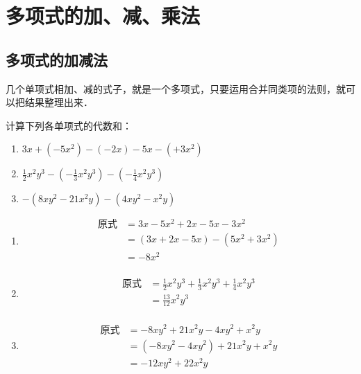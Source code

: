 \section{多项式的加、减、乘法}
\subsection{多项式的加减法}
几个单项式相加、减的式子，就是一个多项式，只要运用合并同类项的法则，就可以把结果整理出来．

\begin{example}
    计算下列各单项式的代数和：
\begin{enumerate}
    \item $3x+(-5x^2)-(-2x)-5x-(+3x^2)$
    \item $\frac{1}{2}x^2y^3-\left(-\frac{1}{3}x^2y^3\right)-\left(-\frac{1}{4}x^2y^3\right)$
    \item $-(8xy^2-21x^2y)-(4xy^2-x^2y)$
\end{enumerate}
\end{example}

\begin{solution}
    \begin{enumerate}
        \item \begin{align*}
            \text{原式}&=3x-5x^2+2x-5x-3x^2 \tag{去括号}\\
            &=(3x+2x-5x)-(5x^2+3x^2)\tag{交换、结合律}\\
            &=-8x^2 \tag{合并同类项法则}\\
        \end{align*}
        \item \begin{align*}
            \text{原式}&=\frac{1}{2}x^2y^3+\frac{1}{3}x^2y^3+\frac{1}{4}x^2y^3\tag{去括号}\\
            &=\frac{13}{12}x^2y^3  \tag{合并同类项法则}\\
        \end{align*}
        \item \begin{align*}
            \text{原式}&=-8xy^2+21x^2y-4xy^2+x^2y\\
            &=(-8xy^2-4xy^2)+21x^2y+x^2y\\
            &=-12xy^2+22x^2y
        \end{align*}
    \end{enumerate}
\end{solution}

